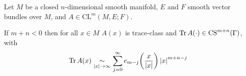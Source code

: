 \begin{theorem}
    Let $M$ be a closed $n$-dimensional smooth manifold, $E$ and $F$ smooth
    vector bundles over $M$, and $A\in\mathrm{CL}^m(M,E; F)$.

    If $m+n<0$ then for all $x\in M$ $A(x)$ is trace-class and $\operatorname{Tr} A(\cdot)\in
    \mathrm{CS}^{m+n}(\Gamma)$, with
    \[
        \operatorname{Tr} A(x)\mathrel{\underset{\left|x\right|\to\infty}{\sim}}
        \sum_{j=0}^{\infty} e_{m-j}\!\left(\frac{x}{\left|x\right|}\right)
                            \left|x\right|^{m+n-j}
    \]
\end{theorem}
